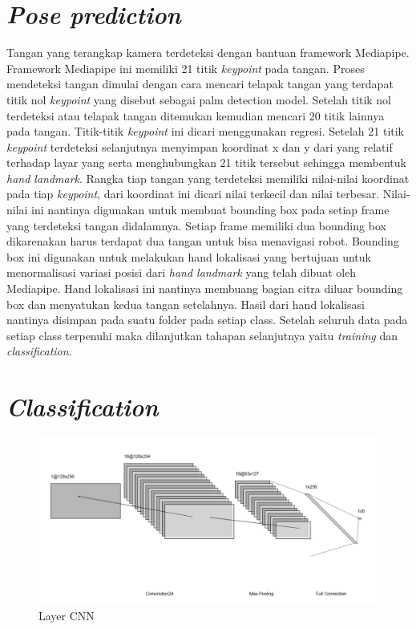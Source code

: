 \section{\emph{Pose prediction}}

Tangan yang terangkap kamera terdeteksi dengan bantuan framework Mediapipe. Framework Mediapipe ini memiliki 21 titik  \emph{keypoint} pada tangan. Proses mendeteksi tangan dimulai dengan cara mencari telapak tangan yang terdapat titik nol \emph{keypoint} yang disebut sebagai palm detection model. Setelah titik nol terdeteksi atau telapak tangan ditemukan kemudian mencari 20 titik lainnya pada tangan. Titik-titik \emph{keypoint} ini dicari menggunakan regresi. Setelah 21 titik \emph{keypoint} terdeteksi selanjutnya menyimpan koordinat x dan y dari yang relatif terhadap layar yang serta menghubungkan 21 titik tersebut sehingga membentuk \emph{hand landmark}. Rangka tiap tangan yang terdeteksi memiliki nilai-nilai koordinat pada tiap \emph{keypoint}, dari koordinat ini dicari nilai terkecil dan nilai terbesar.  Nilai-nilai ini nantinya digunakan untuk membuat bounding box pada setiap frame yang terdeteksi tangan didalamnya. Setiap frame memiliki dua bounding box dikarenakan harus terdapat dua tangan untuk bisa menavigasi robot. Bounding box ini digunakan untuk melakukan hand lokalisasi yang bertujuan untuk menormalisasi variasi posisi dari \emph{hand landmark} yang telah dibuat oleh Mediapipe. Hand lokalisasi ini nantinya membuang bagian citra diluar bounding box dan menyatukan kedua tangan setelahnya. Hasil dari hand lokalisasi nantinya disimpan pada suatu folder pada setiap class. Setelah seluruh data pada setiap class terpenuhi maka dilanjutkan tahapan selanjutnya yaitu \emph{training} dan \emph{classification}.

\section{\emph{Classification}}

\begin{figure}[!h]
  \centering
  \includegraphics[width=1\linewidth]{gambar/LayerCnn.png}
  \caption{Layer CNN}
  \label{fig:layerCNn}
\end{figure}

